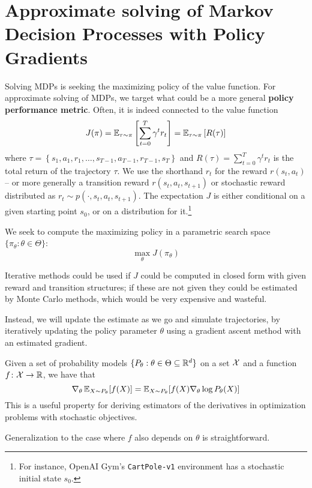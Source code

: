 \documentclass[../course-notes.tex]{subfiles}
\begin{document}
\chapter{Approximate solving of Markov Decision Processes with Policy Gradients}


Solving MDPs is seeking the maximizing policy of the value function. For approximate solving of MDPs, we target what could be a more general \textbf{\bluefont policy performance metric}. Often, it is indeed connected to the value function
\begin{equation}\label{eq:PolicyPerfCumReward}
J(\pi) = \operatorname{\mathbb{E}}_{\tau\sim\pi}\left[
\sum_{t=0}^{T} \gamma^t r_t
\right] =
\operatorname{\mathbb{E}}_{\tau\sim\pi}
\left[R(\tau)\right]
\end{equation}
where $\tau = \left\{ s_1,a_1,r_1,\ldots,s_{T-1},a_{T-1},r_{T-1},s_{T}\right\}$ and $R(\tau) = \sum_{t=0}^T \gamma^t r_t$ is the total return of the trajectory $\tau$.
We use the shorthand $r_t$ for the reward $r(s_t, a_t)$ -- or more generally a transition reward $r(s_t, a_t, s_{t+1})$ or stochastic reward distributed as $r_t \sim p(\cdot, s_t, a_t, s_{t+1})$. The expectation $J$ is either conditional on a given starting point $s_0$, or on a distribution for it.\footnote{For instance, OpenAI Gym's \texttt{CartPole-v1} environment has a stochastic initial state $s_0$.}

We seek to compute the maximizing policy in a parametric search space $\{\pi_\theta: \theta\in\Theta\}$:
\[
\max_\theta J(\pi_\theta)
\]

Iterative methods could be used if $J$ could be computed in closed form with given reward and transition structures; if these are not given they could be estimated by Monte Carlo methods, which would be very expensive and wasteful.

Instead, we will update the estimate as we go and simulate trajectories, by iteratively updating the policy parameter $\theta$ using a gradient ascent method with an estimated gradient.

\begin{prop}\label{prop:parametricGradient}
	Given a set of probability models $\{P_\theta: \theta\in\Theta\subseteq \mathbb{R}^d\}$ on a set $\mathcal{X}$ and a function $f\colon \mathcal{X}\to \mathbb{R}$, we have that
	\[
	\nabla_\theta \operatorname{\mathbb{E}}_{X\sim P_\theta}[f(X)]
	= \operatorname{\mathbb{E}}_{X\sim P_\theta}[f(X)\nabla_\theta \log P_\theta(X)]
	\]
	This is a useful property for deriving estimators of the derivatives in optimization problems with stochastic objectives.
	
	Generalization to the case where $f$ also depends on $\theta$ is straightforward.
\end{prop}
\end{document}

